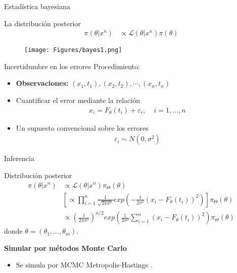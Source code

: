 \documentclass[10pt]{beamer}
\begin{document}
\begin{frame}[fragile]{Estadística bayesiana}
  
  La distribución posterior 
  \begin{align*}
      \pi(\theta|x^n) &\propto \mathcal{L}(\theta|x^n) \pi(\theta)
  \end{align*}
  

\begin{figure}[H] 
    \centering 
    \texttt{[image: Figures/bayes1.png]} 
\end{figure} 




\end{frame}

\begin{frame}[fragile]{Incertidumbre en los errores}
  Procedimiento:
  \begin{itemize}
    \item 
    \textbf{Observaciones:} $(x_1, t_1), (x_2,t_2), \cdots, (x_n, t_n)$ 
    \item 
    Cuantificar el error mediante la relación
    \begin{align*}
        x_i = F_\theta (t_i) + \varepsilon_i, \:\:\:\:\: i = 1,...,n
    \end{align*}
    \item Un supuesto convencional sobre los errores
    \begin{align*}
        \varepsilon_i \sim N(0,\sigma^2)
        \label{3.02}
    \end{align*}

  \end{itemize}

\end{frame}

\begin{frame}[fragile]{Inferencia}
  
  Distribución posterior 
  \begin{align*}
      \pi(\theta|x^n) &\propto \mathcal{L}(\theta|x^n) \pi_{\Theta}(\theta)\\
      & \left[\propto \prod_{i=1}^n \frac{1}{\sqrt{2\pi \sigma^2}} exp \left({-\frac{1}{2\sigma^2}\left(x_i - F_{\theta}(t_i)\right)^2 }\right)\right] \pi_{\Theta}(\theta) \\
      & \propto \left(\frac{1}{2\pi\sigma^2}\right)^{n/2} exp {\left(\frac{1}{2\sigma^2} \sum_{i =1}^{n}\left(x_i - F_{\theta}(t_i)\right) ^2\right) } \pi_{\Theta}(\theta)
  \end{align*}
  donde $\theta = (\theta_1, ..., \theta_m)$.
  
  \vspace{1 cm}

  \textbf{Simular por métodos Monte Carlo}
  \begin{itemize}
    \item 
    Se simula por MCMC Metropolis-Hastings \cite{robert1999monte}.
  \end{itemize}


\end{frame}
\end{document}
